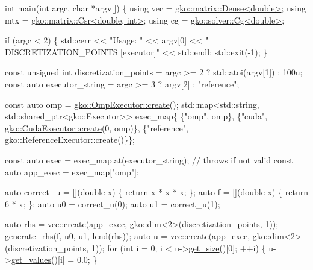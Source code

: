 \begin{DoxyCodeInclude}
\textcolor{keywordtype}{int} main(\textcolor{keywordtype}{int} argc, \textcolor{keywordtype}{char} *argv[])
\{
    \textcolor{keyword}{using} vec = \hyperlink{classgko_1_1matrix_1_1Dense}{gko::matrix::Dense<double>};
    \textcolor{keyword}{using} mtx = \hyperlink{classgko_1_1matrix_1_1Csr}{gko::matrix::Csr<double, int>};
    \textcolor{keyword}{using} cg = \hyperlink{classgko_1_1solver_1_1Cg}{gko::solver::Cg<double>};

    \textcolor{keywordflow}{if} (argc < 2) \{
        std::cerr << \textcolor{stringliteral}{"Usage: "} << argv[0] << \textcolor{stringliteral}{" DISCRETIZATION\_POINTS [executor]"}
                  << std::endl;
        std::exit(-1);
    \}

    \textcolor{keyword}{const} \textcolor{keywordtype}{unsigned} \textcolor{keywordtype}{int} discretization\_points =
        argc >= 2 ? std::atoi(argv[1]) : 100u;
    \textcolor{keyword}{const} \textcolor{keyword}{auto} executor\_string = argc >= 3 ? argv[2] : \textcolor{stringliteral}{"reference"};

    \textcolor{keyword}{const} \textcolor{keyword}{auto} omp = \hyperlink{classgko_1_1OmpExecutor_a33ca05fdd0fc928ee262fc9425304874}{gko::OmpExecutor::create}();
    std::map<std::string, std::shared\_ptr<gko::Executor>> exec\_map\{
        \{\textcolor{stringliteral}{"omp"}, omp\},
        \{\textcolor{stringliteral}{"cuda"}, \hyperlink{classgko_1_1CudaExecutor_a2718a92034350650ef406ffdb60db090}{gko::CudaExecutor::create}(0, omp)\},
        \{\textcolor{stringliteral}{"reference"}, gko::ReferenceExecutor::create()\}\};

    \textcolor{keyword}{const} \textcolor{keyword}{auto} exec = exec\_map.at(executor\_string);  \textcolor{comment}{// throws if not valid}
    \textcolor{keyword}{const} \textcolor{keyword}{auto} app\_exec = exec\_map[\textcolor{stringliteral}{"omp"}];

    \textcolor{keyword}{auto} correct\_u = [](\textcolor{keywordtype}{double} x) \{ \textcolor{keywordflow}{return} x * x * x; \};
    \textcolor{keyword}{auto} f = [](\textcolor{keywordtype}{double} x) \{ \textcolor{keywordflow}{return} 6 * x; \};
    \textcolor{keyword}{auto} u0 = correct\_u(0);
    \textcolor{keyword}{auto} u1 = correct\_u(1);

    \textcolor{keyword}{auto} rhs = vec::create(app\_exec, \hyperlink{structgko_1_1dim}{gko::dim<2>}(discretization\_points, 1));
    generate\_rhs(f, u0, u1, lend(rhs));
    \textcolor{keyword}{auto} u = vec::create(app\_exec, \hyperlink{structgko_1_1dim}{gko::dim<2>}(discretization\_points, 1));
    \textcolor{keywordflow}{for} (\textcolor{keywordtype}{int} i = 0; i < u->\hyperlink{classgko_1_1LinOp_a31b3c003388eb0b95393154f68c2b98d}{get\_size}()[0]; ++i) \{
        u->\hyperlink{classgko_1_1matrix_1_1Dense_a3bc458e02fab8e4c9f60f70bd4d5a4f9}{get\_values}()[i] = 0.0;
    \}


\end{DoxyCodeInclude}
